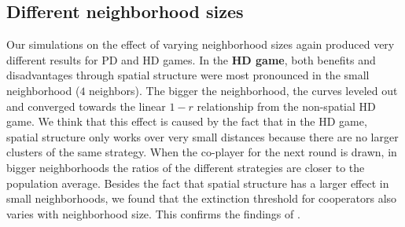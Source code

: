 \subsection{Different neighborhood sizes}

Our simulations on the effect of varying neighborhood sizes again produced very different results for PD and HD games. 
In the \textbf{HD game}, both benefits and disadvantages through spatial structure were most pronounced in the small neighborhood ($4$ neighbors). The bigger the neighborhood, the curves leveled out and converged towards the linear $1-r$ relationship from the non-spatial HD game. We think that this effect is caused by the fact that in the HD game, spatial structure only works over very small distances because there are no larger clusters of the same strategy. When the co-player for the next round is drawn, in bigger neighborhoods the ratios of the different strategies are closer to the population average.
Besides the fact that spatial structure has a larger effect in small neighborhoods, we found that the extinction threshold for cooperators also varies with neighborhood size. This confirms the findings of \cite{HauertandDoebeli2004}.\\

